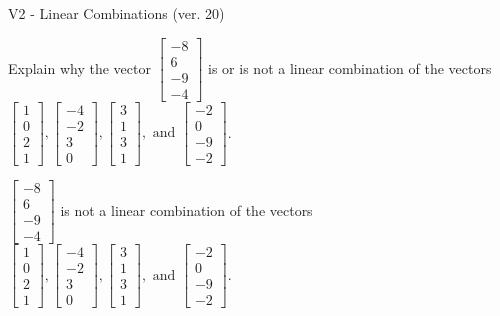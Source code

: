 \begin{exercise}
  \begin{exerciseTitle}V2 - Linear Combinations (ver. 20)\end{exerciseTitle}
  \begin{exerciseStatement}
    Explain why the vector \(\left[\begin{array}{c}
-8 \\
6 \\
-9 \\
-4
\end{array}\right]\)  is or is not a linear 
	combination of the vectors \(\left[\begin{array}{c}
1 \\
0 \\
2 \\
1
\end{array}\right] , \left[\begin{array}{c}
-4 \\
-2 \\
3 \\
0
\end{array}\right] , \left[\begin{array}{c}
3 \\
1 \\
3 \\
1
\end{array}\right] , \text{ and } \left[\begin{array}{c}
-2 \\
0 \\
-9 \\
-2
\end{array}\right]\).
	


  \end{exerciseStatement}
  \begin{exerciseAnswer}
   \(\left[\begin{array}{c}
-8 \\
6 \\
-9 \\
-4
\end{array}\right]\) 
  	 is not  
	a linear combination of the vectors \(\left[\begin{array}{c}
1 \\
0 \\
2 \\
1
\end{array}\right] , \left[\begin{array}{c}
-4 \\
-2 \\
3 \\
0
\end{array}\right] , \left[\begin{array}{c}
3 \\
1 \\
3 \\
1
\end{array}\right] , \text{ and } \left[\begin{array}{c}
-2 \\
0 \\
-9 \\
-2
\end{array}\right]\).


\end{exerciseAnswer}
\end{exercise}
